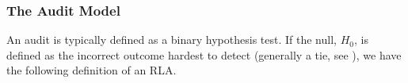 


\subsubsection{The Audit Model}
An audit is typically defined as a binary hypothesis test. If the null, $H_0$, is defined as the incorrect outcome hardest to detect (generally a tie, see \cite{Bayesian-RLA}), we have the following definition of an RLA. 

